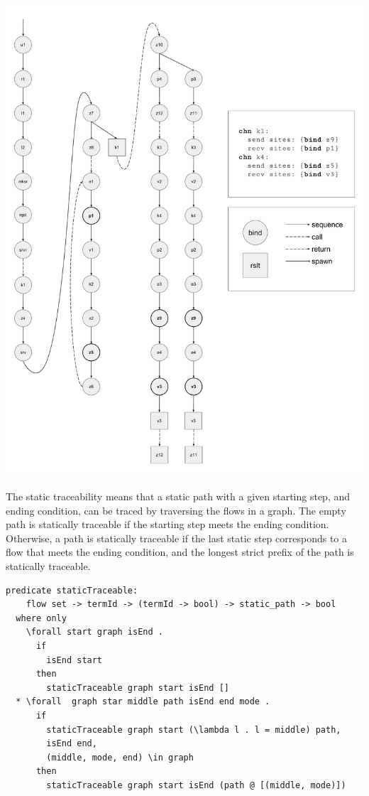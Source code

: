 \documentclass[letterpaper, 11pt]{extarticle}
\begin{document}
\includegraphics[width=.9\textwidth]{cml-graph.pdf}

The static traceability means that a static path with a given starting step, and ending
condition, can be traced by traversing the flows in a graph.
The empty path is statically traceable if the starting step meets the ending condition.
Otherwise, a path is statically traceable if the last static step corresponds to a flow
that meets the ending condition, and the longest strict prefix of the path is statically
traceable.  

\begin{lstlisting}[language=logic, mathescape]
  predicate staticTraceable:
    flow set -> termId -> (termId -> bool) -> static_path -> bool
  where only
    \forall start graph isEnd .
      if
        isEnd start
      then
        staticTraceable graph start isEnd []
  * \forall  graph star middle path isEnd end mode .
      if 
        staticTraceable graph start (\lambda l . l = middle) path, 
        isEnd end, 
        (middle, mode, end) \in graph 
      then
        staticTraceable graph start isEnd (path @ [(middle, mode)])
\end{lstlisting}
\end{document}
